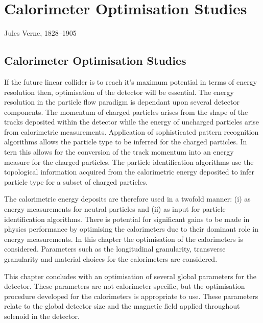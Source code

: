 \chapter{Calorimeter Optimisation Studies}
\label{chap:detopt}

{Jules Verne, 1828--1905}


\section{Calorimeter Optimisation Studies}
If the future linear collider is to reach it's maximum potential in terms of energy resolution then, optimisation of the detector will be essential.  The energy resolution in the particle flow paradigm is dependant upon several detector components.  The momentum of charged particles arises from the shape of the tracks deposited within the detector while the energy of uncharged particles arise from calorimetric measurements.  Application of sophisticated pattern recognition algorithms allows the particle type to be inferred for the charged particles.  In tern this allows for the conversion of the track momentum into an energy measure for the charged particles.  The particle identification algorithms use the topological information acquired from the calorimetric energy deposited to infer particle type for a subset of charged particles.  

The calorimetric energy deposits are therefore used in a twofold manner: (i) as energy measurements for neutral particles and (ii) as input for particle identification algorithms.  There is potential for significant gains to be made in physics performance by optimising the calorimeters due to their dominant role in energy measurements.  In this chapter the optimisation of the calorimeters is considered.  Parameters such as the longitudinal granularity, transverse granularity and material choices for the calorimeters are considered.  

This chapter concludes with an optimisation of several global parameters for the detector.  These parameters are not calorimeter specific, but the optimisation procedure developed for the calorimeters is appropriate to use.  These parameters relate to the global detector size and the magnetic field applied throughout solenoid in the detector.

